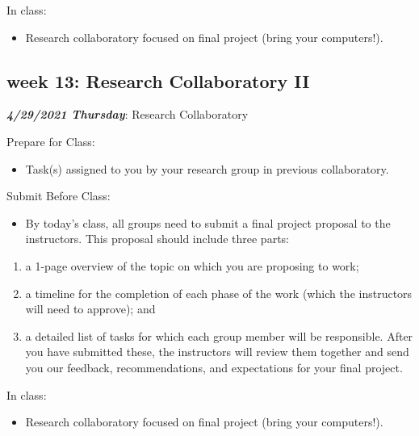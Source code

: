 \documentclass[
]{book}
\providecommand{\tightlist}{%
  \setlength{\itemsep}{0pt}\setlength{\parskip}{0pt}}
\begin{document}
In class:

\begin{itemize}
\tightlist
\item
  Research collaboratory focused on final project (bring your computers!).
\end{itemize}

\hypertarget{week-13-research-collaboratory-ii}{%
\subsection{week 13: Research Collaboratory II}\label{week-13-research-collaboratory-ii}}

\textbf{\emph{4/29/2021 Thursday}}: Research Collaboratory

Prepare for Class:

\begin{itemize}
\tightlist
\item
  Task(s) assigned to you by your research group in previous collaboratory.
\end{itemize}

Submit Before Class:

\begin{itemize}
\tightlist
\item
  By today's class, all groups need to submit a final project proposal to the instructors. This proposal should include three parts:
\end{itemize}

\begin{enumerate}
\def\labelenumi{(\arabic{enumi})}
\tightlist
\item
  a 1-page overview of the topic on which you are proposing to work;
\item
  a timeline for the completion of each phase of the work (which the instructors will need to approve); and
\item
  a detailed list of tasks for which each group member will be responsible. After you have submitted these, the instructors will review them together and send you our feedback, recommendations, and expectations for your final project.
\end{enumerate}

In class:

\begin{itemize}
\tightlist
\item
  Research collaboratory focused on final project (bring your computers!).
\end{itemize}
\end{document}
